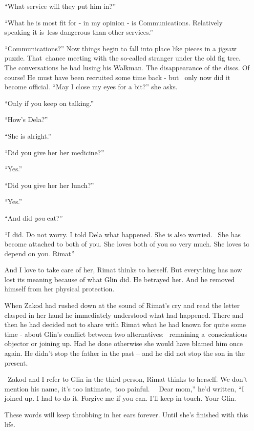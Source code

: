 \documentclass[12pt]{book}
\begin{document}
{}``What service will they put him in?''

{}``What he is most fit for - in my opinion - is Communications. Relatively speaking it is~less dangerous than other
services.''

{}``Communications?'' Now things begin to fall into place like pieces in a jigsaw puzzle. That~chance meeting with the
so-called stranger under the old fig tree. The conversations he had lusing his Walkman. The disappearance of the discs.
Of course! He must have been recruited some time back - but \ only now did it become official. ``May I close my eyes
for a bit?'' she asks.

{}``Only if you keep on talking.''

{}``How's Dela?''

{}``She is alright.''

{}``Did you give her her medicine?''

{}``Yes.''

{}``Did you give her{ }her lunch?''

{}``Yes.''

{}``And did \textit{you} eat?''

{}``I did. Do not worry. I told Dela what happened. She is also worried.~ She has become attached to both of you. She
loves both of you so very much. She loves to depend on you. Rimat''

And I love to take care of her, Rimat thinks to herself. But everything has now lost its meaning because of what Glin
did. He betrayed her. And he removed himself from her physical protection.

When{ }Zakod had rushed down at the sound of Rimat's cry and read the letter clasped in her hand he
immediately understood what had happened. There and then he had decided{ }not to share with Rimat what
he had known for quite some time - about Glin's conflict between two alternatives: ~remaining a~conscientious objector
or joining up. Had he done otherwise she would have blamed him once again. He didn't stop the father in the past -- and
he did not stop the son in the present.

~Zakod and I refer to Glin in the third person, Rimat thinks to herself. We don't mention his name, it's too
intimate,~too painful. \ \ {\textquotedbl}Dear mom,'' he'd written, ``I joined up. I had to do it. Forgive me if you
can. I'll keep in touch. Your Glin.{\textquotedbl}

These words will keep throbbing in her ears forever. Until she's finished with this life.
\end{document}
